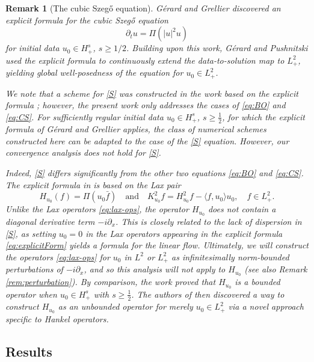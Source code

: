 \documentclass [11pt] {article}
\newtheorem{rem}[thm]{Remark}
\newcommand{\<}{\langle}
\renewcommand{\>}{\rangle}
\begin{document}
\begin{rem}[The cubic Szeg\H o equation]\label{rem:szego}
Gérard and Grellier \cite{gerard2015explicit} discovered an explicit formula for the cubic Szeg\H{o} equation
\begin{equation}
\partial_t u= \Pi(|u|^2u)
\label{S}\tag{S}
\end{equation}
for initial data $u_0 \in H^s_{+}$, $s\ge 1/2$.
Building upon this work, G\'erard and Pushnitski \cite{GP} used the explicit formula to continuously extend the data-to-solution map to $L^2_+$, yielding global well-posedness of the equation for $u_0 \in L^2_{+}$.

We note that a scheme for \eqref{S} was constructed in the work \cite{ABCD24} based on the explicit formula \cite{gerard2015explicit}; however, the present work only addresses the cases of \eqref{eq:BO} and \eqref{eq:CS}.  For sufficiently regular initial data $u_0 \in H^s_{+}$, $s\ge \frac12$, for which the explicit formula of Gérard and Grellier \cite{gerard2015explicit} applies, the class of numerical schemes constructed here can be adapted to the case of the \eqref{S} equation. However, our convergence analysis does not hold for \eqref{S}.

Indeed, \eqref{S} differs significantly from the other two equations \eqref{eq:BO} and \eqref{eq:CS}.  The explicit formula in \cite{gerard2015explicit,GP} is based on the Lax pair
\[
H_{u_0}(f) = \Pi(u_0 \bar{f })\quad \text{and} \quad K_{u_0}^2f=H_{u_0}^2f-\langle f, u_0\rangle u_0, \quad f \in L^2_{+}.
\]
Unlike the Lax operators \eqref{eq:lax-ops}, the operator $H_{u_0}$ does not contain a diagonal derivative term $-i\partial_x$.
 This is closely related to the lack of dispersion in \eqref{S}, as setting $u_0 = 0$ in the Lax operators appearing in the explicit formula \eqref{eq:explicitForm} yields a formula for the linear flow.
Ultimately, we will construct the operators \eqref{eq:lax-ops} for $u_0$ in $ L^2$ or $L^2_{+}$ as infinitesimally norm-bounded perturbations of $-i\partial_x$, and so this analysis will not apply to $H_{u_0}$ (see also Remark \ref{rem:perturbation}).  By comparison, the work \cite{gerard2015explicit} proved that $H_{u_0}$ is a bounded operator when $u_0\in H^s_+$ with $s\geq\frac12$.  The authors of \cite{GP} then discovered a way to construct $H_{u_0}$ as an unbounded operator for merely $u_0\in L^2_+$ via a novel approach specific to Hankel operators.
\end{rem}

\subsection{Results}
\end{document}
